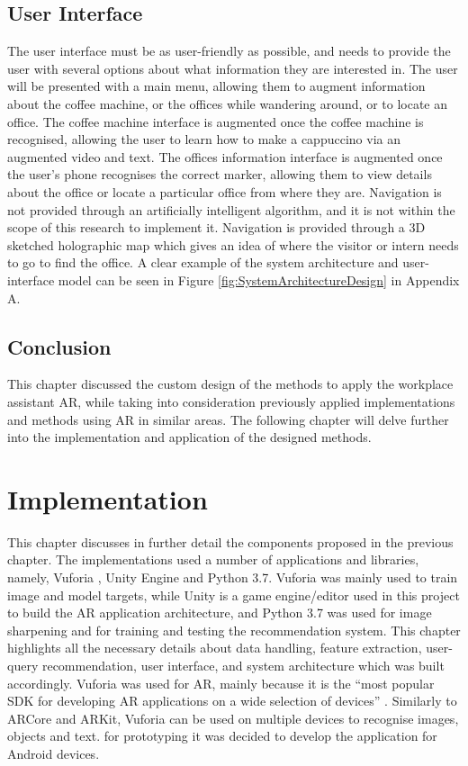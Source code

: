 \documentclass{aifyp}
\begin{document}
\subsection{User Interface}
\indent The user interface must be as user-friendly as possible, and needs to provide the user with several options about what information they are interested in. The user will be presented with a main menu, allowing them to augment information about the coffee machine, or the offices while wandering around, or to locate an office. The coffee machine interface is augmented once the coffee machine is recognised, allowing the user to learn how to make a cappuccino via an augmented video and text. The offices information interface is augmented once the user’s phone recognises the correct marker, allowing them to view details about the office or locate a particular office from where they are. Navigation is not provided through an artificially intelligent algorithm, and it is not within the scope of this research to implement it. Navigation is provided through a 3D sketched holographic map which gives an idea of where the visitor or intern needs to go to find the office. A clear example of the system architecture and user-interface model can be seen in Figure \ref{fig:SystemArchitectureDesign} in Appendix A.

\subsection{Conclusion}
This chapter discussed the custom design of the methods to apply the workplace assistant AR, while taking into consideration previously applied implementations and methods using AR in similar areas. The following chapter will delve further into the implementation and application of the designed methods. 
\newpage
\section{Implementation}
This chapter discusses in further detail the components proposed in the previous chapter. The implementations used a number of applications and libraries, namely, Vuforia \cite{VuforiaUnity}, Unity Engine \cite{VuforiaUnity} and Python 3.7. Vuforia was mainly used to train image and model targets, while Unity is a game engine/editor used in this project to build the AR application architecture, and Python 3.7 was used for image sharpening and for training and testing the recommendation system. This chapter highlights all the necessary details about data handling, feature extraction, user-query recommendation, user interface, and system architecture which was built accordingly. Vuforia was used for AR, mainly because it is the “most popular SDK for developing AR applications on a wide selection of devices” \cite{VuforiaUnity}. Similarly to ARCore and ARKit, Vuforia can be used on multiple devices to recognise images, objects and text. for prototyping it was decided to develop the application for Android devices.
\end{document}

